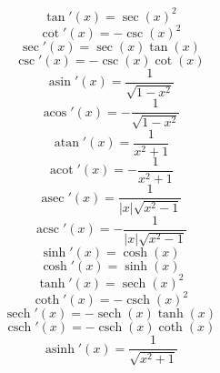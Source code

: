 \documentclass{article}
\DeclareMathOperator{\asin}{asin}
\DeclareMathOperator{\acos}{acos}
\DeclareMathOperator{\atan}{atan}
\DeclareMathOperator{\acot}{acot}
\DeclareMathOperator{\asec}{asec}
\DeclareMathOperator{\acsc}{acsc}
\DeclareMathOperator{\sech}{sech}
\DeclareMathOperator{\csch}{csch}
\DeclareMathOperator{\asinh}{asinh}
\begin{document}
    \begin{equation}
        \tan'(x)=\sec(x)^2
    \end{equation}
    \begin{equation}
        \cot'(x)=-\csc(x)^2
    \end{equation}
    \begin{equation}
        \sec'(x)=\sec(x)\tan(x)
    \end{equation}
    \begin{equation}
        \csc'(x)=-\csc(x)\cot(x)
    \end{equation}
    \begin{equation}
        \asin'(x)=\frac{1}{\sqrt{1-x^2}}
    \end{equation}
    \begin{equation}
        \acos'(x)=-\frac{1}{\sqrt{1-x^2}}
    \end{equation}
    \begin{equation}
        \atan'(x)=\frac{1}{x^2+1}
    \end{equation}
    \begin{equation}
        \acot'(x)=-\frac{1}{x^2+1}
    \end{equation}
    \begin{equation}
        \asec'(x)=\frac{1}{|x|\sqrt{x^2-1}}
    \end{equation}
    \begin{equation}
        \acsc'(x)=-\frac{1}{|x|\sqrt{x^2-1}}
    \end{equation}
    \begin{equation}
        \sinh'(x)=\cosh(x)
    \end{equation}
    \begin{equation}
        \cosh'(x)=\sinh(x)
    \end{equation}
    \begin{equation}
        \tanh'(x)=\sech(x)^2
    \end{equation}
    \begin{equation}
        \coth'(x)=-\csch(x)^2
    \end{equation}
    \begin{equation}
        \sech'(x)=-\sech(x)\tanh(x)
    \end{equation}
    \begin{equation}
        \csch'(x)=-\csch(x)\coth(x)
    \end{equation}
    \begin{equation}
        \asinh'(x)=\frac{1}{\sqrt{x^2+1}}
    \end{equation}
\end{document}
